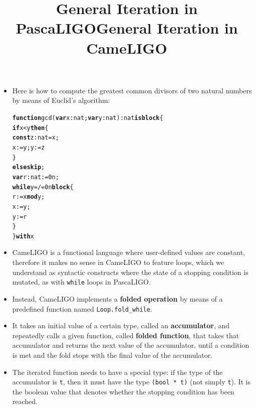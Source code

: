 \documentclass[wide]{slides}
\newcommand{\Kblock}[0]{\textbf{block}\xspace}
\newcommand{\Kconst}[0]{\textbf{const}\xspace}
\newcommand{\Kelse}[0]{\textbf{else}\xspace}
\newcommand{\Kfunction}[0]{\textbf{function}\xspace}
\newcommand{\Kif}[0]{\textbf{if}\xspace}
\newcommand{\Kis}[0]{\textbf{is}\xspace}
\newcommand{\Kmod}[0]{\textbf{mod}\xspace}
\newcommand{\Kskip}[0]{\textbf{skip}\xspace}
\newcommand{\Kthen}[0]{\textbf{then}\xspace}
\newcommand{\Kvar}[0]{\textbf{var}\xspace}
\newcommand{\Kwhile}[0]{\textbf{while}\xspace}
\newcommand{\Kwith}[0]{\textbf{with}\xspace}
\begin{document}
\begin{slide}
  \title{General Iteration in PascaLIGO}

  \begin{itemize}

    \item Here is how to compute the greatest common divisors of two
      natural numbers by means of Euclid's algorithm:
      \begin{alltt}
\Kfunction gcd (\Kvar x : nat; \Kvar y : nat) : nat \Kis \Kblock \{
  \Kif x < y \Kthen \{
    \Kconst z : nat = x;
    x := y; y := z
  \}
  \Kelse \Kskip;
  \Kvar r : nat := 0n;
  \Kwhile y =/= 0n \Kblock \{
    r := x \Kmod y;
    x := y;
    y := r
  \}
\} \Kwith x
      \end{alltt}

  \end{itemize}

\end{slide}

\begin{slide}
  \title{General Iteration in CameLIGO}

  \begin{itemize}

    \item CameLIGO is a functional language where user-defined values
      are constant, therefore it makes no sense in CameLIGO to feature
      loops, which we understand as syntactic constructs where the
      state of a stopping condition is mutated, as with \texttt{while}
      loops in PascaLIGO.

    \item Instead, CameLIGO implements a \textbf{folded operation} by
      means of a predefined function named \texttt{Loop.fold\_while}.

    \item It takes an initial value of a certain type, called an
      \textbf{accumulator}, and repeatedly calls a given function,
      called \textbf{folded function}, that takes that accumulator
      and returns the next value of the accumulator, until a condition
      is met and the fold stops with the final value of the
      accumulator.

    \item The iterated function needs to have a special type: if the
      type of the accumulator is \texttt{t}, then it must have the
      type \texttt{(bool * t)} (not simply \texttt{t}). It is the
      boolean value that denotes whether the stopping condition has
      been reached.

  \end{itemize}

\end{slide}
\end{document}

